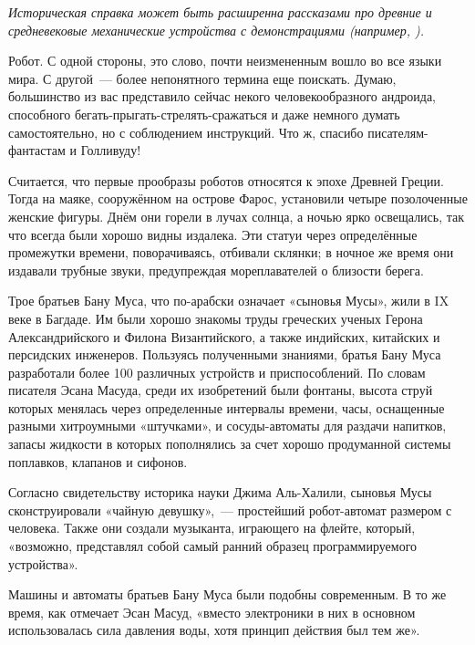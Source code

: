 {\slshape Историческая справка может быть расширенна рассказами про древние и средневековые механические устройства с демонстрациями (например, 	\href{http://www.etudes.ru/ru/etudes/stopohod/}{}).}

Робот. С одной стороны, это слово, почти неизмененным вошло во все языки мира. С другой~--- более непонятного термина еще поискать. Думаю, большинство из вас представило сейчас некого человекообразного андроида, способного бегать-прыгать-стрелять-сражаться и даже немного думать самостоятельно, но с соблюдением инструкций. Что ж, спасибо писателям-фантастам и Голливуду!

Считается, что первые прообразы роботов относятся к эпохе Древней Греции. Тогда на маяке, сооружённом на острове Фарос, установили четыре позолоченные женские фигуры. Днём они горели в лучах солнца, а ночью ярко освещались, так что всегда были хорошо видны издалека. Эти статуи через определённые промежутки времени, поворачиваясь, отбивали склянки; в ночное же время они издавали трубные звуки, предупреждая мореплавателей о близости берега.

Трое братьев Бану Муса, что по-арабски означает «сыновья Мусы», жили в IX веке в Багдаде. Им были хорошо знакомы труды греческих ученых Герона Александрийского и Филона Византийского, а также индийских, китайских и персидских инженеров. Пользуясь полученными знаниями, братья Бану Муса разработали более 100 различных устройств и приспособлений. По словам писателя Эсана Масуда, среди их изобретений были фонтаны, высота струй которых менялась через определенные интервалы времени, часы, оснащенные разными хитроумными «штучками», и сосуды-автоматы для раздачи напитков, запасы жидкости в которых пополнялись за счет хорошо продуманной системы поплавков, клапанов и сифонов.

Согласно свидетельству историка науки Джима Аль-Халили, сыновья Мусы сконструировали «чайную девушку»,~--- простейший робот-автомат размером с человека. Также они создали музыканта, играющего на флейте, который, «возможно, представлял собой самый ранний образец программируемого устройства».

Машины и автоматы братьев Бану Муса были подобны современным. В то же время, как отмечает Эсан Масуд, «вместо электроники в них в основном использовалась сила давления воды, хотя принцип действия был тем же».

